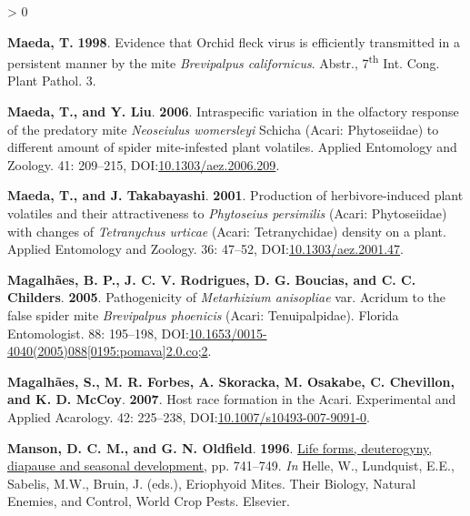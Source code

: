 \documentclass{ufdissertation}[overrideChapters] %
\newlength{\cslhangindent}
\newenvironment{CSLReferences}[2] %
 {%
  \setlength{\parindent}{0pt}
  \ifodd #1 \everypar{\setlength{\hangindent}{\cslhangindent}}\ignorespaces\fi
  \ifnum #2 > 0
  \setlength{\parskip}{#2\baselineskip}
  \fi
 }%
 {}
\begin{document}
{\begin{CSLReferences}{1}{1}
\leavevmode{}%
\textbf{Maeda, T.} \textbf{1998}. Evidence that {Orchid fleck virus} is efficiently transmitted in a persistent manner by the mite {\emph{Brevipalpus californicus}}. Abstr., 7\textsuperscript{th} Int. Cong. Plant Pathol. 3.

\leavevmode{}%
\textbf{Maeda, T., and Y. Liu}. \textbf{2006}. Intraspecific variation in the olfactory response of the predatory mite {\emph{Neoseiulus womersleyi}} {Schicha} {({Acari}: {Phytoseiidae})} to different amount of spider mite-infested plant volatiles. Applied Entomology and Zoology. 41: 209--215, DOI:\href{https://doi.org/10.1303/aez.2006.209}{10.1303/aez.2006.209}.

\leavevmode{}%
\textbf{Maeda, T., and J. Takabayashi}. \textbf{2001}. Production of herbivore-induced plant volatiles and their attractiveness to {\emph{Phytoseius persimilis}} {({Acari}: {Phytoseiidae})} with changes of {\emph{Tetranychus urticae}} {({Acari}: Tetranychidae)} density on a plant. Applied Entomology and Zoology. 36: 47--52, DOI:\href{https://doi.org/10.1303/aez.2001.47}{10.1303/aez.2001.47}.

\leavevmode{}%
\textbf{Magalhães, B. P., J. C. V. Rodrigues, D. G. Boucias, and C. C. Childers}. \textbf{2005}. Pathogenicity of {\emph{Metarhizium anisopliae}} var. Acridum to the false spider mite {\emph{Brevipalpus phoenicis}} ({Acari}: {Tenuipalpidae}). Florida Entomologist. 88: 195--198, DOI:\href{https://doi.org/10.1653/0015-4040(2005)088\%5B0195:pomava\%5D2.0.co;2}{10.1653/0015-4040(2005)088{[}0195:pomava{]}2.0.co;2}.

\leavevmode{}%
\textbf{Magalhães, S., M. R. Forbes, A. Skoracka, M. Osakabe, C. Chevillon, and K. D. McCoy}. \textbf{2007}. Host race formation in the {Acari}. Experimental and Applied Acarology. 42: 225--238, DOI:\href{https://doi.org/10.1007/s10493-007-9091-0}{10.1007/s10493-007-9091-0}.

\leavevmode{}%
\textbf{Manson, D. C. M., and G. N. Oldfield}. \textbf{1996}. \href{https://doi.org/10.1016/s1572-4379(96)80050-9}{Life forms, deuterogyny, diapause and seasonal development}, pp. 741--749. \emph{In} Helle, W., Lundquist, E.E., Sabelis, M.W., Bruin, J. (eds.), Eriophyoid Mites. Their Biology, Natural Enemies, and Control, World Crop Pests. Elsevier.


\end{CSLReferences}}
\end{document}
